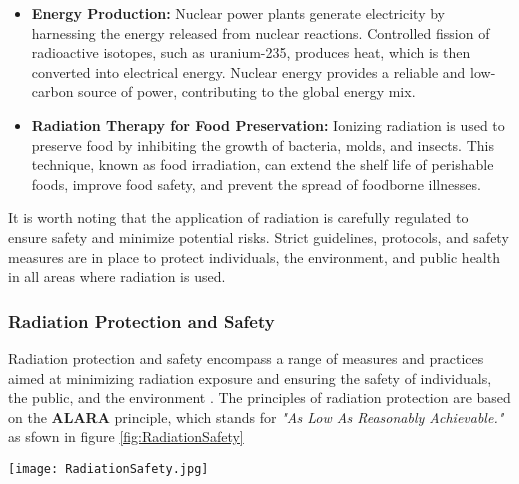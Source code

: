 \documentclass[../../Report.tex]{subfiles}
\begin{document}
\begin{itemize}
            \item \textbf{Energy Production:} Nuclear power plants generate electricity by harnessing the energy released from nuclear reactions. 
            Controlled fission of radioactive isotopes, such as uranium-235, produces heat, which is then converted into electrical energy. 
            Nuclear energy provides a reliable and low-carbon source of power, contributing to the global energy mix.

            \item \textbf{Radiation Therapy for Food Preservation:} Ionizing radiation is used to preserve food by inhibiting the growth of bacteria, 
            molds, and insects. This technique, known as food irradiation, can extend the shelf life of perishable foods, improve food safety, and 
            prevent the spread of foodborne illnesses.

        \end{itemize}

        It is worth noting that the application of radiation is carefully regulated to ensure safety and minimize potential risks. 
        Strict guidelines, protocols, and safety measures are in place to protect individuals, the environment, and public health in all areas 
        where radiation is used.
    
    \subsubsection*{\large Radiation Protection and Safety}
        Radiation protection and safety encompass a range of measures and practices aimed at minimizing radiation exposure and ensuring the 
        safety of individuals, the public, and the environment \cite{b3}. The principles of radiation protection are based on the \textbf{ALARA} principle, 
        which stands for \textit{"As Low As Reasonably Achievable."} as sfown in figure \ref{fig:RadiationSafety}\

        \begin{Figure}
            \centering
            \texttt{[image: RadiationSafety.jpg]}
            \label{fig:RadiationSafety}
        \end{Figure}

        
        
\end{document}
